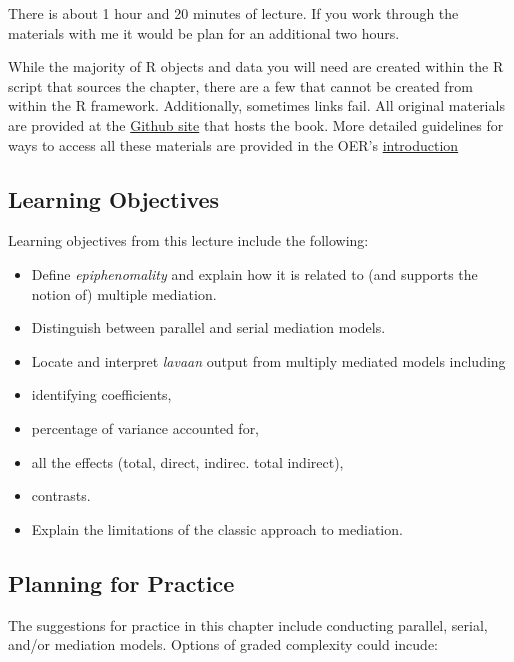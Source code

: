 \documentclass[
]{book}
\providecommand{\tightlist}{%
  \setlength{\itemsep}{0pt}\setlength{\parskip}{0pt}}
\begin{document}
There is about 1 hour and 20 minutes of lecture. If you work through the materials with me it would be plan for an additional two hours.

While the majority of R objects and data you will need are created within the R script that sources the chapter, there are a few that cannot be created from within the R framework. Additionally, sometimes links fail. All original materials are provided at the \href{https://https://github.com/lhbikos/ReC_MultivModel}{Github site} that hosts the book. More detailed guidelines for ways to access all these materials are provided in the OER's \protect\hyperlink{ReCintro}{introduction}

\hypertarget{learning-objectives-5}{%
\subsection{Learning Objectives}\label{learning-objectives-5}}

Learning objectives from this lecture include the following:

\begin{itemize}
\tightlist
\item
  Define \emph{epiphenomality} and explain how it is related to (and supports the notion of) multiple mediation.
\item
  Distinguish between parallel and serial mediation models.
\item
  Locate and interpret \emph{lavaan} output from multiply mediated models including
\item
  identifying coefficients,
\item
  percentage of variance accounted for,\\
\item
  all the effects (total, direct, indirec. total indirect),
\item
  contrasts.
\item
  Explain the limitations of the classic approach \citep{baron_moderator-mediator_1986} to mediation.
\end{itemize}

\hypertarget{planning-for-practice-5}{%
\subsection{Planning for Practice}\label{planning-for-practice-5}}

The suggestions for practice in this chapter include conducting parallel, serial, and/or mediation models. Options of graded complexity could incude:
\end{document}
